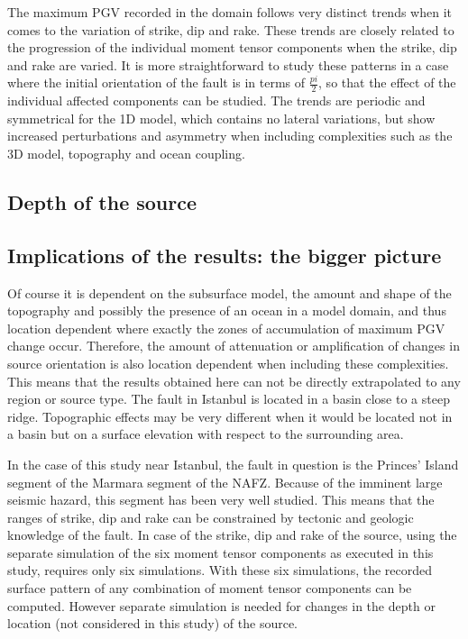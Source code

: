 \documentclass[../00main.tex]{subfiles}
\begin{document}
The maximum PGV recorded in the domain follows very distinct trends when it comes to the variation of strike, dip and rake. These trends are closely related to the progression of the individual moment tensor components when the strike, dip and rake are varied. It is more straightforward to study these patterns in a case where the initial orientation of the fault is in terms of $\frac{pi}{2}$, so that the effect of the individual affected components can be studied. The trends are periodic and symmetrical for the 1D model, which contains no lateral variations, but show increased perturbations and asymmetry when including complexities such as the 3D model, topography and ocean coupling. 



\subsection{Depth of the source}




\subsection{Implications of the results: the bigger picture}

Of course it is dependent on the subsurface model, the amount and shape of the topography and possibly the presence of an ocean in a model domain, and thus location dependent where exactly the zones of accumulation of maximum PGV change occur. Therefore, the amount of attenuation or amplification of changes in source orientation is also location dependent when including these complexities. This means that the results obtained here can not be directly extrapolated to any region or source type. The fault in Istanbul is located in a basin close to a steep ridge. Topographic effects may be very different when it would be located not in a basin but on a surface elevation with respect to the surrounding area. 

In the case of this study near Istanbul, the fault in question is the Princes' Island segment of the Marmara segment of the NAFZ. Because of the imminent large seismic hazard, this segment has been very well studied. This means that the ranges of strike, dip and rake can be constrained by tectonic and geologic knowledge of the fault. In case of the strike, dip and rake of the source, using the separate simulation of the six moment tensor components as executed in this study, requires only six simulations. With these six simulations, the recorded surface pattern of any combination of moment tensor components can be computed. However separate simulation is needed for changes in the depth or location (not considered in this study) of the source. 
\end{document}
